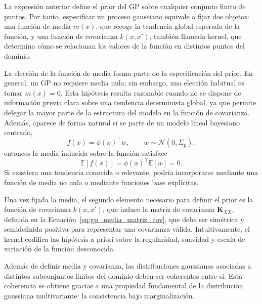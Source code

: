 \noindent La expresión anterior define el prior del GP sobre cualquier conjunto finito de
puntos. Por tanto, especificar un proceso gaussiano equivale a fijar dos objetos:
una función de media $m(x)$, que recoge la tendencia global esperada de la función,
y una función de covarianza $k(x,x')$, también llamada kernel, que determina cómo
se relacionan los valores de la función en distintos puntos del dominio.

La elección de la función de media forma parte de la especificación del prior. En general,
un GP no requiere media nula; sin embargo, una elección habitual es tomar $m(x)=0.$
Esta hipótesis resulta razonable cuando no se dispone de información previa clara
sobre una tendencia determinista global, ya que permite delegar la mayor parte de
la estructura del modelo en la función de covarianza. Además, aparece de forma
natural si se parte de un modelo lineal bayesiano centrado,
\[
f(x)=\phi(x)^\top w,
\qquad
w\sim\mathcal{N}(0,\Sigma_p),
\]
entonces la media inducida sobre la función satisface
\[
\mathbb{E}[f(x)] = \phi(x)^\top\mathbb{E}[w] = 0.
\]
Si existiera una tendencia conocida o relevante,
podría incorporarse mediante una función de media no nula o mediante funciones base
explícitas.

\medskip
\noindent Una vez fijada la media, el segundo elemento necesario para definir el prior es la
función de covarianza \(k(x,x')\), que induce la matriz de covarianza
\(\mathbf{K}_{XX}\), definida en la Ecuación~\eqref{eq:gp_media_matriz_cov}, que debe ser simétrica y semidefinida positiva para representar una covarianza válida. Intuitivamente, el kernel codifica las hipótesis a priori sobre la regularidad, suavidad y escala de variación de la función desconocida.

Además de definir media y covarianza, las distribuciones gaussianas asociadas a
distintos subconjuntos finitos del dominio deben ser coherentes entre sí. Esta
coherencia se obtiene gracias a una propiedad fundamental de la distribución
gaussiana multivariante: la consistencia bajo marginalización.

